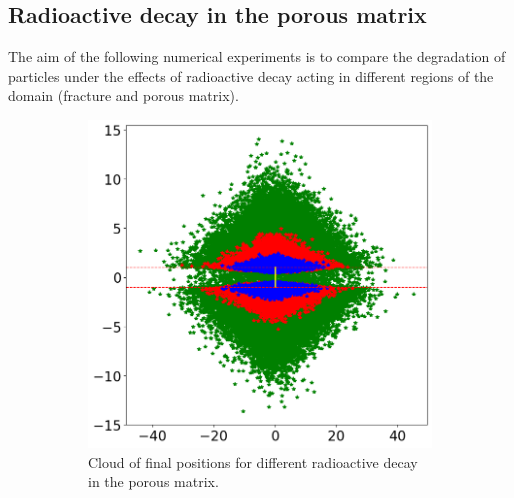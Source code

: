 \documentclass{article}
\begin{document}
\subsection{Radioactive decay in the porous matrix}
The aim of the following numerical experiments is to compare the degradation of particles under the effects of radioactive decay acting in different regions of the domain (fracture and porous matrix).
\begin{figure}[htbp]
    \centering
    \begin{subfigure}[b]{0.48\textwidth}
        \centering
        \includegraphics[width=\textwidth]{images/finalPositionMatrixDecay.png}
        \caption{Cloud of final positions for different radioactive decay in the porous matrix.}
    \end{subfigure}
    \hfill
    \begin{subfigure}[b]{0.48\textwidth}
        \centering

\end{subfigure}
\end{figure}
\end{document}
